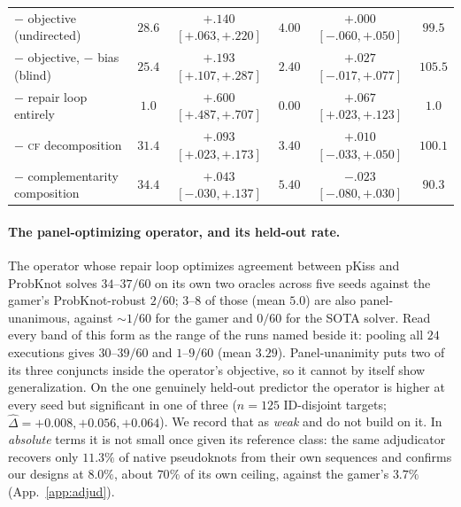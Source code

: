 \documentclass[11pt]{article}
\newcommand{\CF}{\textsc{cf}}
\begin{document}
\begin{table}[t]
\begin{tabularx}{\linewidth}{@{}Lccccc@{}}
\midrule
$-$ objective (undirected) & $28.6$ & $\mathbf{+.140}$ $[{+}.063,{+}.220]$ & $4.00$ & $+.000$ $[{-}.060,{+}.050]$ & $99.5$\\
$-$ objective, $-$ bias (blind) & $25.4$ & $\mathbf{+.193}$ $[{+}.107,{+}.287]$ & $2.40$ & $+.027$ $[{-}.017,{+}.077]$ & $105.5$\\
$-$ repair loop entirely & $1.0$ & $\mathbf{+.600}$ $[{+}.487,{+}.707]$ & $0.00$ & $\mathbf{+.067}$ $[{+}.023,{+}.123]$ & $1.0$\\
$-$ \CF{} decomposition & $31.4$ & $\mathbf{+.093}$ $[{+}.023,{+}.173]$ & $3.40$ & $+.010$ $[{-}.033,{+}.050]$ & $100.1$\\
$-$ complementarity composition & $34.4$ & $+.043$ $[{-}.030,{+}.137]$ & $5.40$ & $-.023$ $[{-}.080,{+}.030]$ & $90.3$\\
\bottomrule
\end{tabularx}
\end{table}

\paragraph{The panel-optimizing operator, and its held-out rate.} The operator whose repair loop optimizes
agreement between pKiss and ProbKnot solves $34$--$37/60$ on its own two oracles across five seeds against the
gamer's ProbKnot-robust $2/60$; $3$--$8$ of those (mean $5.0$) are also panel-unanimous, against $\sim\!1/60$
for the gamer and $0/60$ for the SOTA solver. Read every band of this form as the range of the runs named
beside it: pooling all $24$ executions gives $30$--$39/60$ and $1$--$9/60$ (mean $3.29$). Panel-unanimity puts
two of its three conjuncts inside the operator's objective, so it cannot by itself show generalization. On the
one genuinely held-out predictor the operator is higher at every seed but significant in one of three ($n{=}125$
ID-disjoint targets; $\widehat\Delta = {+}0.008, {+}0.056, {+}0.064$). We record that as \emph{weak} and do not
build on it. In \emph{absolute} terms it is not small once given its reference class: the same adjudicator
recovers only $11.3\%$ of native pseudoknots from their own sequences and confirms our designs at $8.0\%$,
about $70\%$ of its own ceiling, against the gamer's $3.7\%$ (App.~\ref{app:adjud}).
\end{document}
